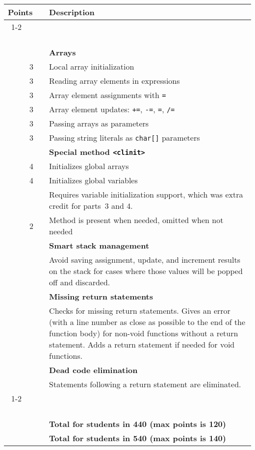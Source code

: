 \documentclass{article}
\makeatletter
\newcommand{\gradeline}{ \cline{1-2} \cline{4-4} ~\\[-1.5ex] }
\newenvironment{gradetable}{\begin{longtable}{@{~~}rrcp{5in}} \multicolumn{2}{l}{\bf Points} & & {\bf Description}\\ \gradeline}{\end{longtable}}
\newcommand{\mainitem}[2]{\pagebreak[2] {\bf #1} &&& {\bf #2}}
\newcommand{\mainpara}[1]{~ &&& {#1} }
\newcommand{\inneritem}[2]{~ & #1 && #2}
\newcommand{\innerpara}[1]{~ & ~ && #1}
\newcommand{\parser}{3}
\newcommand{\typecheck}{4}
\makeatother
\begin{document}
\begin{gradetable}
  \mainitem{18}{Arrays}
  \\[1mm]
  \inneritem{3}{Local array initialization}
  \\[1mm]
  \inneritem{3}{Reading array elements in expressions}
  \\[1mm]
  \inneritem{3}{Array element assignments with {\tt =}}
  \\[1mm]
  \inneritem{3}{Array element updates: {\tt +=}, {\tt -=}, {\tt *=}, {\tt /=}}
  \\[1mm]
  \inneritem{3}{Passing arrays as parameters}
  \\[1mm]
  \inneritem{3}{Passing string literals as {\tt char[]} parameters}
  \\[4mm]

  \mainitem{10}{Special method {\tt <clinit>}}
  \\[1mm]
  \inneritem{4}{Initializes global arrays}
  \\[1mm]
  \inneritem{4}{Initializes global variables}
  \\
  \innerpara{%
    Requires variable initialization support,
    which was extra credit for parts~\parser{} and \typecheck{}.
  }
  \\[1mm]
  \inneritem{2}{Method is present when needed, omitted when not needed}
  \\[4mm]

  \mainitem{4}{Smart stack management}
  \\[1mm]
  \mainpara{%
    Avoid saving assignment, update, and increment results on
    the stack for cases where those values will be popped off
    and discarded.
  }
  \\[4mm]

  \mainitem{4}{Missing return statements}
  \\[1mm]
  \mainpara{%
    Checks for missing return statements.
    Gives an error (with a line number as close as possible
    to the end of the function body) for non-void functions
    without a return statement.
    Adds a return statement if needed for void functions.
  }
  \\[4mm]

  \mainitem{4}{Dead code elimination}
  \\[1mm]
  \mainpara{%
    Statements following a return statement
    are eliminated.
  }
  \\[4mm]

  \gradeline
  \mainitem{100}{Total for students in 440 (max points is 120)}
  \\
  \mainitem{120}{Total for students in 540 (max points is 140)}
\end{gradetable}
\end{document}

